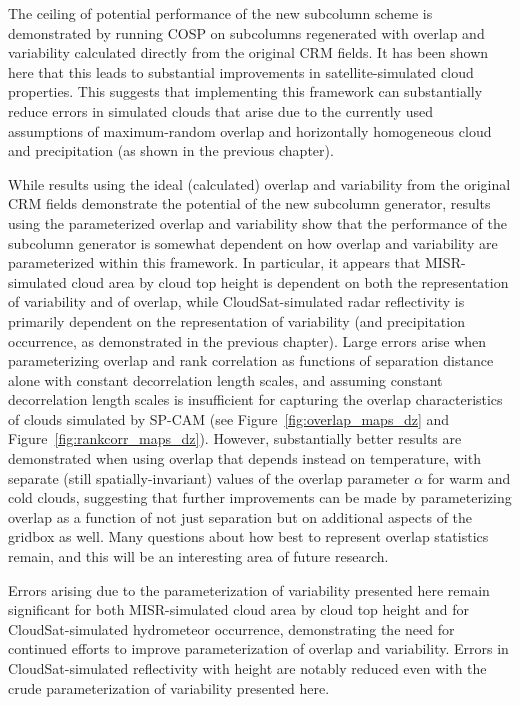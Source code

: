 The ceiling of potential performance of the new subcolumn scheme is
demonstrated by running COSP on subcolumns regenerated with overlap and
variability calculated directly from the original CRM fields. It has
been shown here that this leads to substantial improvements in
satellite-simulated cloud properties. This suggests that implementing
this framework can substantially reduce errors in simulated clouds that
arise due to the currently used assumptions of maximum-random overlap
and horizontally homogeneous cloud and precipitation (as shown in the
previous chapter).

While results using the ideal (calculated) overlap and variability from
the original CRM fields demonstrate the potential of the new subcolumn
generator, results using the parameterized overlap and variability show
that the performance of the subcolumn generator is somewhat dependent on
how overlap and variability are parameterized within this framework. In
particular, it appears that MISR-simulated cloud area by cloud top
height is dependent on both the representation of variability and of
overlap, while CloudSat-simulated radar reflectivity is primarily
dependent on the representation of variability (and precipitation
occurrence, as demonstrated in the previous chapter). Large errors arise
when parameterizing overlap and rank correlation as functions of
separation distance alone with constant decorrelation length scales, and
assuming constant decorrelation length scales is insufficient for
capturing the overlap characteristics of clouds simulated by SP-CAM (see
Figure~\ref{fig:overlap_maps_dz} and Figure~\ref{fig:rankcorr_maps_dz}).
However, substantially better results are demonstrated when using
overlap that depends instead on temperature, with separate (still
spatially-invariant) values of the overlap parameter \(\alpha\) for warm
and cold clouds, suggesting that further improvements can be made by
parameterizing overlap as a function of not just separation but on
additional aspects of the gridbox as well. Many questions about how best
to represent overlap statistics remain, and this will be an interesting
area of future research.

Errors arising due to the parameterization of variability presented here
remain significant for both MISR-simulated cloud area by cloud top
height and for CloudSat-simulated hydrometeor occurrence, demonstrating
the need for continued efforts to improve parameterization of overlap
and variability. Errors in CloudSat-simulated reflectivity with height
are notably reduced even with the crude parameterization of variability
presented here.

